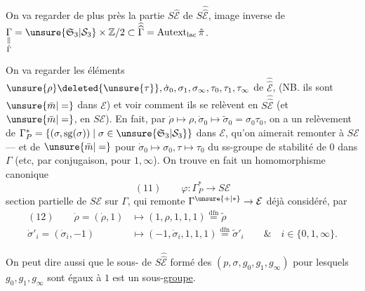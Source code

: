 On va regarder de plus près la partie $S\hat{\mathcal E}$ de $S\widehat{\widehat{\mathcal E}}$, image inverse de
$\underset{\substack{\Vert\\\hat\Gamma}}{\Gamma}=\unsure{\mathfrak S_3|\mathcal S_3}\times\mathbb Z/2\subset\widehat{\widehat\Gamma}=\operatorname{Autext}_{\mathrm{lac}}\hat\pi$.

On va regarder les éléments $\unsure{\rho}\deleted{\unsure{\tau}},\dot\sigma_0,\sigma_1,\sigma_\infty,\tau_0,\tau_1,\tau_\infty$ de $\widehat{\widehat{\mathcal E}}$,  (NB. ils sont $\unsure{\bar m|=}$ dans $\mathcal E$) et voir comment ils se relèvent en $S\widehat{\widehat{\mathcal E}}$ (et $\unsure{\bar m|=}$, en $S\mathcal E$). En fait, par $\dot\rho\mapsto\rho,\dot\sigma_0\mapsto\tilde\sigma_0=\sigma_0\tau_0$, on a un relèvement  de $\Gamma_P^*=\{(\sigma,\operatorname{sg}(\sigma))\mid\sigma\in\unsure{\mathfrak S_3|\mathcal S_3}\}$ dans $\mathcal E$, qu'on aimerait remonter à $S\mathcal E$ --- et de $\unsure{\bar m|=}$ pour $\dot\sigma_0\mapsto\sigma_0,\tau\mapsto\tau_0$ du ss-groupe de stabilité de $0$ dans $\Gamma$ (etc, par conjugaison,  pour $1,\infty$). On trouve en fait un homomorphisme canonique
\[
(11)\qquad\varphi:\Gamma_P^*\longrightarrow S\mathcal E
\]
 section partielle de $S\mathcal E$ sur $\Gamma$, qui remonte $\Gamma^{\unsure{+|*}}\to\mathcal E$ déjà considéré, par
\[
\begin{aligned}
(12)\qquad \dot\rho=(\dot\rho,1)&\longmapsto(1,\rho,1,1,1)\overset{\mathrm{dfn}}{=}\tilde\rho\\
\dot\sigma'_i=(\dot\sigma_i,-1)&\longmapsto(-1,\dot\sigma_i,1,1,1)\overset{\mathrm{dfn}}{=}\tilde\sigma'_i\qquad\&\quad i\in\{0,1,\infty\}.
\end{aligned}
\]

On peut dire aussi que le sous- de $S\widehat{\widehat{\mathcal E}}$ formé des $(p,\sigma,g_0,g_1,g_\infty)$ pour lesquels $g_0,g_1,g_\infty$ sont égaux à $1$ est un sous-\uline{groupe}.
